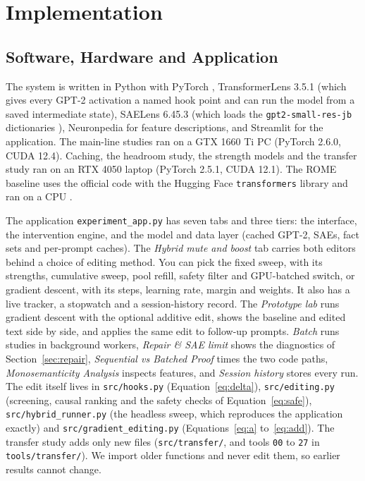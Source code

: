 \chapter{Implementation}\label{ch:implementation}

\section{Software, Hardware and Application}

The system is written in Python with PyTorch \cite{r22}, TransformerLens 3.5.1 \cite{r13} (which gives every GPT-2 activation a named hook point and can run the model from a saved intermediate state), SAELens 6.45.3 \cite{r14} (which loads the \texttt{gpt2-small-res-jb} dictionaries \cite{r15}), Neuronpedia \cite{r20} for feature descriptions, and Streamlit \cite{r66} for the application. The main-line studies ran on a GTX 1660 Ti PC (PyTorch 2.6.0, CUDA 12.4). Caching, the headroom study, the strength models and the transfer study ran on an RTX 4050 laptop (PyTorch 2.5.1, CUDA 12.1). The ROME baseline uses the official code \cite{r64} with the Hugging Face \texttt{transformers} library \cite{r63} and ran on a CPU \cite{p15}.

The application \texttt{experiment\_app.py} has seven tabs and three tiers: the interface, the intervention engine, and the model and data layer (cached GPT-2, SAEs, fact sets and per-prompt caches). The \emph{Hybrid mute and boost} tab carries both editors behind a choice of editing method. You can pick the fixed sweep, with its strengths, cumulative sweep, pool refill, safety filter and GPU-batched switch, or gradient descent, with its steps, learning rate, margin and weights. It also has a live tracker, a stopwatch and a session-history record. The \emph{Prototype lab} runs gradient descent with the optional additive edit, shows the baseline and edited text side by side, and applies the same edit to follow-up prompts. \emph{Batch} runs studies in background workers, \emph{Repair \& SAE limit} shows the diagnostics of Section~\ref{sec:repair}, \emph{Sequential vs Batched Proof} times the two code paths, \emph{Monosemanticity Analysis} inspects features, and \emph{Session history} stores every run. The edit itself lives in \texttt{src/hooks.py} (Equation~\ref{eq:delta}), \texttt{src/editing.py} (screening, causal ranking and the safety checks of Equation~\ref{eq:safe}), \texttt{src/hybrid\_runner.py} (the headless sweep, which reproduces the application exactly) and \texttt{src/gradient\_editing.py} (Equations~\ref{eq:a} to~\ref{eq:add}). The transfer study adds only new files (\texttt{src/transfer/}, and tools \texttt{00} to \texttt{27} in \texttt{tools/transfer/}). We import older functions and never edit them, so earlier results cannot change.

